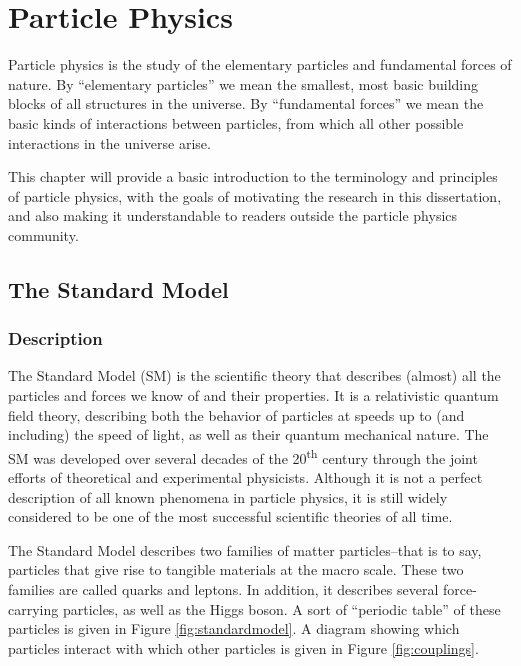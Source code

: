 \chapter{Particle Physics}
\label{chap:particlephysics}

Particle physics is the study of the elementary particles and fundamental forces
of nature. By ``elementary particles'' we mean the smallest, most
basic building blocks of all structures in the universe. By
``fundamental forces'' we mean the basic kinds of interactions between
particles, from which all other possible interactions in the universe
arise.

This chapter will provide a basic introduction to the terminology
and principles of particle physics, with the goals of motivating the
research in this dissertation, and also making it understandable to
readers outside the particle physics community.

\section{The Standard Model}
\label{sec:standardmodel}

\subsection{Description}
\label{ssec:SMdescription}

The Standard Model (SM) is the scientific theory that describes
(almost) all the particles and forces we know of and their properties.
It is a relativistic quantum field theory, describing both the
behavior of particles at speeds up to (and including) the speed of
light, as well as their quantum mechanical nature.
The SM was developed over several decades of the 20\textsuperscript{th}
century through the joint efforts of theoretical and experimental physicists.
Although it is not a perfect description of all known phenomena in
particle physics, it is still widely considered to be one of the most
successful scientific theories of all time. %

The Standard Model describes two families of matter particles--that is
to say, particles that give rise to tangible materials at the macro scale.
These two families are called quarks and leptons. In addition, it
describes several force-carrying particles, as well as the Higgs
boson. A sort of ``periodic table'' of these particles is given in
Figure \ref{fig:standardmodel}. A diagram showing which particles
interact with which other particles is given in Figure \ref{fig:couplings}.

